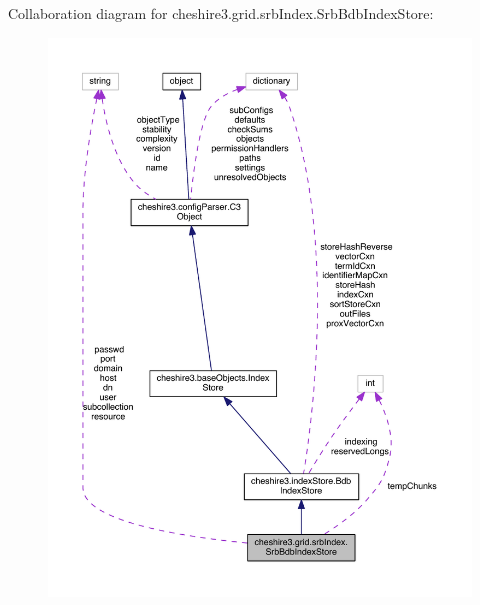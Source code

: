 Collaboration diagram for cheshire3.\-grid.\-srb\-Index.\-Srb\-Bdb\-Index\-Store\-:
\nopagebreak
\begin{figure}[H]
\begin{center}
\leavevmode
\includegraphics[width=350pt]{classcheshire3_1_1grid_1_1srb_index_1_1_srb_bdb_index_store__coll__graph}
\end{center}
\end{figure}
